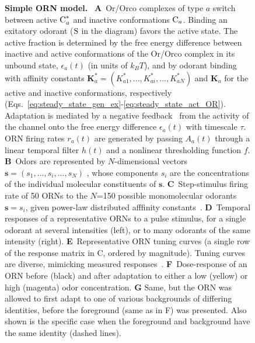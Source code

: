 \documentclass[10pt,prl,aps,showpacs,twocolumn,unsortedaddress,showkeys,linenumbers]{revtex4-1}
\begin{document}
\begin{figure}[!tb]
{{		\textbf{Simple ORN model.}~\cite{srinivas_elife} \textbf{A}~Or/Orco complexes of type $a$ switch between active $\textup{C}^*_a$ and inactive conformations $\textup{C}_a$. Binding an exitatory odorant ($\textup{S}$ in the diagram) favors the active state. The active fraction is determined by the free energy difference between inactive and active conformations of the Or/Orco complex in its unbound state, $\epsilon_a(t)$ (in units of $k_B T$), and by odorant binding with affinity constants $\mathbf{K}^*_a=(K^*_{a1},...,K^*_{ai},...,K^*_{aN})$ and $\mathbf{K}_a$ for the active and inactive conformations, respectively (Eqs.~\ref{eq:steady_state_gen_ex}-\ref{eq:steady_state_act_OR}). Adaptation is mediated by a negative feedback~\cite{nagel_wilson_biophysical} from the activity of the channel onto the free energy difference $\epsilon_a(t)$ with timescale $\tau$. ORN firing rates $r_a(t)$ are generated by passing $A_a(t)$ through a linear temporal filter $h(t)$ and a nonlinear thresholding function $f$.
		\textbf{B}~Odors are represented by $N$-dimensional vectors $\mathbf{s}=(s_1,...,s_i,...,s_N)$ , whose components $s_i$ are the concentrations of  the individual molecular constituents  of $\mathbf s$. 
		\textbf{C}~Step-stimulus firing rate of 50 ORNs to the $N$=150 possible monomolecular odorants $\mathbf s = s_i$, given  power-law distributed afffinity constants~\cite{si2017invariances}.
		\textbf{D}~Temporal responses of a representative ORNs to a pulse stimulus, for a single odorant at several intensities (left), or to many odorants of the same intensity (right).
		\textbf{E}~Representative ORN tuning curves (a single row of the response matrix in C, ordered by magnitude). Tuning curves are diverse, mimicking measured responses~\cite{hallem_carlson}.
		{\color {blue} 
		\textbf{F}~Dose-response of an ORN before (black) and after adaptation to either a low (yellow) or high (magenta) odor concentration.  
		\textbf{G} Same, but the ORN was allowed to first adapt to one of various backgrounds of differing identities, before the foreground (same as in F) was presented. Also shown is the specific case when the foreground and background have the same identity (dashed lines).}}
		}
		\label{fig:tuning_curves}
\end{figure}
\end{document}

